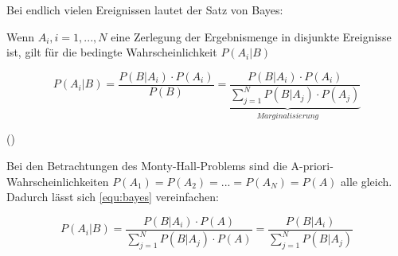 Bei endlich vielen Ereignissen lautet der Satz von Bayes:

Wenn $A_i, i = 1,..., N$ eine Zerlegung der Ergebnismenge in disjunkte Ereignisse ist, gilt für die bedingte Wahrscheinlichkeit $P(A_i | B)$

\begin{equation} \label{equ:bayes}
    P(A_i | B) = \frac{P(B | A_i) \cdot P(A_i)}{P(B)} \underbrace{= \frac{P(B | A_i) \cdot P(A_i)}{\sum_{j = 1}^{N} P(B | A_j) \cdot P(A_j)}}_{Marginalisierung}
\end{equation}

(\cite[S.406f]{Papula:2014})

Bei den Betrachtungen des Monty-Hall-Problems sind die A-priori-Wahrscheinlichkeiten $P(A_1) = P(A_2) = ... = P(A_N) = P(A)$ alle gleich. Dadurch lässt sich \autoref{equ:bayes} vereinfachen:

\begin{equation} \label{equ:bayes_simpl}
    P(A_i | B)  = \frac{P(B | A_i) \cdot P(A)}{\sum_{j=1}^{N} P(B | A_j) \cdot P(A)}  = \frac{P(B|A_i)}{\sum_{j=1}^{N} P(B | A_j)}
\end{equation}
